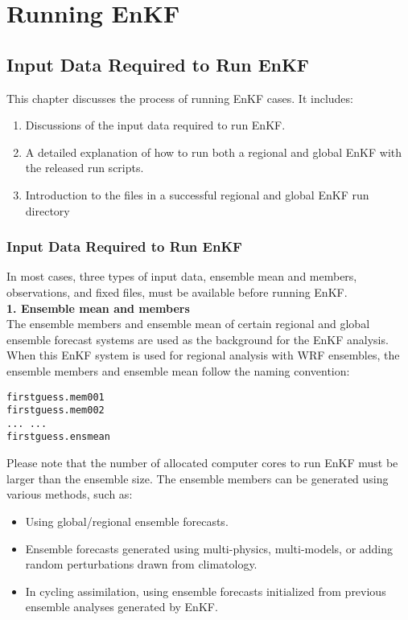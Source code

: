 \chapter{Running EnKF}
\setlength{\parskip}{12pt}

\section{Input Data Required to Run EnKF}

This chapter discusses the process of running EnKF cases. It includes:
\begin{enumerate}
\item Discussions of the input data required to run EnKF.
\item A detailed explanation of how to run both a regional and global EnKF with the released run scripts. 
\item Introduction to the files in a successful regional and global EnKF run directory
\end{enumerate}

\subsection{Input Data Required to Run EnKF}

In most cases, three types of input data, ensemble mean and members, observations, 
and fixed files, must be available before running EnKF.\\

\textbf{1. Ensemble mean and members} \\
The ensemble members and ensemble mean of certain regional and global ensemble 
forecast systems are used as the background for the EnKF analysis. When this EnKF 
system is used for regional analysis with WRF ensembles, the ensemble members 
and ensemble mean follow the naming convention:
\begin{verbatim}
firstguess.mem001 
firstguess.mem002
... ...
firstguess.ensmean
\end{verbatim}

Please note that the number of allocated computer cores to run EnKF must be larger than the ensemble size. 
The ensemble members can be generated using various methods, such as:
\begin{itemize}
\item Using global/regional ensemble forecasts.
\item Ensemble forecasts generated using multi-physics, multi-models, or adding
random perturbations drawn from climatology.
\item In cycling assimilation, using ensemble forecasts initialized from previous ensemble analyses generated by EnKF. 
\end{itemize}

